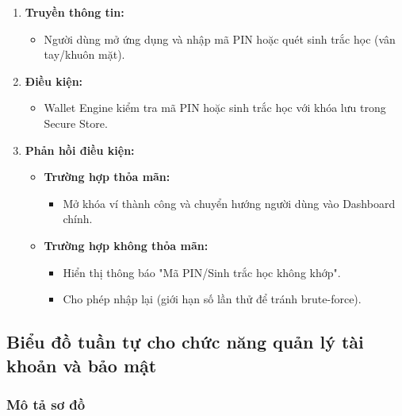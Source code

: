\documentclass[a4paper]{report}
\begin{document}
\begin{enumerate}
    \item \textbf{Truyền thông tin:}
    \begin{itemize}
        \item Người dùng mở ứng dụng và nhập mã PIN hoặc quét sinh trắc học (vân tay/khuôn mặt).
    \end{itemize}

    \item \textbf{Điều kiện:}
    \begin{itemize}
        \item Wallet Engine kiểm tra mã PIN hoặc sinh trắc học với khóa lưu trong Secure Store.
    \end{itemize}

    \item \textbf{Phản hồi điều kiện:}
    \begin{itemize}
        \item \textbf{Trường hợp thỏa mãn:}
        \begin{itemize}
            \item Mở khóa ví thành công và chuyển hướng người dùng vào Dashboard chính.
        \end{itemize}

        \item \textbf{Trường hợp không thỏa mãn:}
        \begin{itemize}
            \item Hiển thị thông báo "Mã PIN/Sinh trắc học không khớp".
            \item Cho phép nhập lại (giới hạn số lần thử để tránh brute-force).
        \end{itemize}
    \end{itemize}
\end{enumerate}



\subsection{Biểu đồ tuần tự cho chức năng quản lý tài khoản và bảo mật}

\subsubsection{Mô tả sơ đồ}
\end{document}
